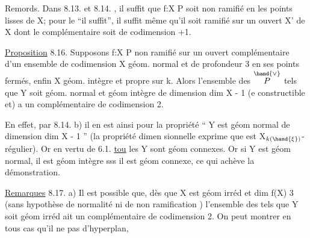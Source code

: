 

Remords. Dans 8.13. et 8.14. , il suffit  que f:X\hand{$\to$} P soit non
ramifié en les points lisses de X; pour le ``il suffit'', il suffit même
qu'il soit  ramifié sur un ouvert X' de X dont le complémentaire soit
de codimension \hand{$\geqslant$} +1.

\uline{Proposition} 8.16. Supposons f:X\hand{$\to$} P non ramifié sur un ouvert
complémentaire d'un ensemble de codimension  X géom. normal et
de profondeur\hand{$\geqslant$} 3 en ses points fermés, enfin X géom. intègre et propre
sur k. Alors l'ensemble des \hand{$\xi \in$} $\overset{\hand{\vee}}{P}$ tels que 
Y\hand{$_\xi$} soit géom. normal et géom intègre de dimension dim X - 1 (e
constructible et) a un complémentaire de codimension \hand{$\geqslant$} 2.

En effet, par 8.14. b) il en est ainsi pour la propriété
`` Y\hand{$_\xi$} est géom normal de dimension dim X - 1 '' (la propriété dimen
sionnelle exprime que \hand{$\phi_\xi$} est X$_{k(\hand{\xi})}$-régulier). Or en vertu de 6.1.
\uline{tou} les Y\hand{$_\xi$} sont géom connexes. Or si Y\hand{$_\xi$} est géom normal, il est
géom intègre sss il est géom connexe, ce qui achève la démonstration.

\uline{Remarques} 8.17. a)  Il est possible que, dès que X est géom irréd
et dim f(X) \hand{$\geqslant$} 3 (sans hypothèse de normalité ni de non ramification )
l'ensemble des \hand{$\xi$} tels que Y\hand{$_\xi$} soit géom irréd ait un complémentaire
de codimension \hand{$\geqslant$}2. On peut montrer en tous cas qu'il ne pas
d'hyperplan, 

